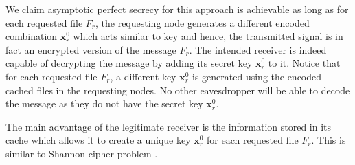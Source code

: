 \documentclass[10pt,journal]{IEEEtran}
\begin{document}
We claim asymptotic perfect secrecy for this approach is achievable as long as for each requested file $F_r$, the requesting node generates a different encoded combination $\mathbf{x}^0_r$ which acts similar to key and hence, the transmitted signal is in fact an encrypted version of the message $F_r$. The intended receiver is indeed capable of decrypting the message by adding its secret key $\mathbf{x}^0_r$ to it. Notice that for each requested file $F_r$, a different key $\mathbf{x}^0_r$ is generated using the encoded cached files in the requesting nodes. No other eavesdropper will be able to decode the message as they do not have the secret key $\mathbf{x}^0_r$. {The main advantage of the legitimate receiver is the information stored in its cache which allows it to create a unique key $\mathbf{x}^0_r$ for each requested file $F_r$. This is similar to Shannon cipher problem \cite{shannon1949communication}. 

}
\end{document}
